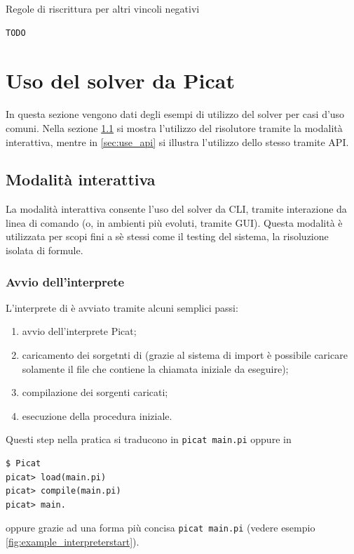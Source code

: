 \documentclass[12pt,a4paper,openright]{book} %
\begin{document}
\begin{algorithm}[H]
	\caption{Regole di riscrittura per altri vincoli negativi}
	\label{alg:othernegatives_constraints}
\end{algorithm}
\begin{verbatim}
TODO
\end{verbatim}


\chapter{Uso del solver \lset{} da Picat}
\label{ch:use}

In questa sezione vengono dati degli esempi di utilizzo del solver per casi d'uso comuni. Nella sezione \ref{sec:use_interactive} si mostra l'utilizzo del risolutore tramite la modalità interattiva, mentre in \ref{sec:use_api} si illustra l'utilizzo dello stesso tramite API.

\section{Modalità interattiva}
\label{sec:use_interactive}

La modalità interattiva consente l'uso del solver da CLI, tramite interazione da linea di comando (o, in ambienti più evoluti, tramite GUI). Questa modalità è utilizzata per scopi fini a sè stessi come il testing del sistema, la risoluzione isolata di formule.

\subsection{Avvio dell'interprete}

L'interprete di \lset{} è avviato tramite alcuni semplici passi:
\begin{enumerate}
	\item avvio dell'interprete Picat;
	\item caricamento dei sorgetnti di \lset{} (grazie al sistema di import è possibile caricare solamente il file che contiene la chiamata iniziale da eseguire);
	\item compilazione dei sorgenti caricati;
	\item esecuzione della procedura iniziale.
\end{enumerate}

Questi step nella pratica si traducono in \texttt{picat main.pi} oppure in \begin{verbatim}
$ Picat
picat> load(main.pi)
picat> compile(main.pi)
picat> main.
\end{verbatim}
oppure grazie ad una forma più concisa \texttt{picat main.pi} (vedere esempio \ref{fig:example_interpreterstart}).
\end{document}
